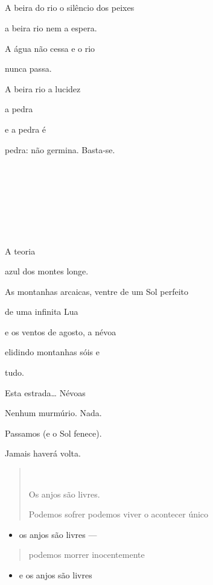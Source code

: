 







A beira do rio o silêncio dos peixes

a beira rio nem a espera.

A água não cessa e o rio

nunca passa.

A beira rio a lucidez

a pedra

e a pedra é

pedra: não germina. Basta-se.







  

A teoria

azul dos montes longe.

As montanhas arcaicas, ventre de um Sol perfeito

de uma infinita Lua

e os ventos de agosto, a névoa

elidindo montanhas sóis e

tudo.

Esta estrada\ldots{} Névoas

Nenhum murmúrio. Nada.

Passamos (e o Sol fenece).

Jamais haverá volta.

\begin{quote}


Os anjos são livres.

Podemos sofrer podemos viver o acontecer único
\end{quote}

\begin{itemize}
\item
  os anjos são livres ---
\end{itemize}

\begin{quote}
podemos morrer inocentemente
\end{quote}

\begin{itemize}
\item
  e os anjos são livres
\end{itemize}

